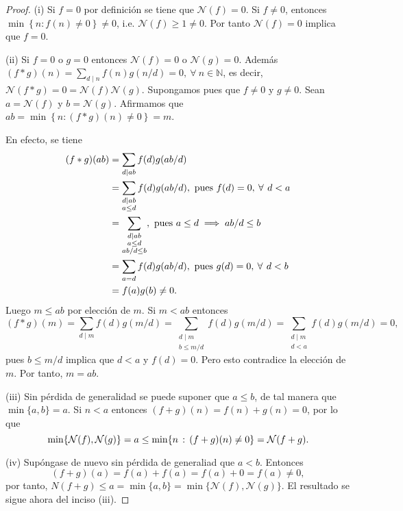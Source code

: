 \begin{proof}
(i) Si $f=0$ por definición se tiene que $\mathcal{N}(f)=0$. Si $f \neq 0$, entonces $\min \left\{n : f(n) \neq 0\right\}\neq 0$, i.e. $\mathcal{N}(f)\geq 1\neq 0$. Por tanto $\mathcal{N}(f)=0$ implica que $f=0$.
\bigskip

(ii) Si $f=0$ o $g=0$ entonces $\mathcal{N}(f)=0$ o $\mathcal{N}(g)=0$. Además $(f*g)(n)=\sum_{d \mid n} f(n)g(n/d)=0, \:\forall\: n \in\mathbb{N}$, es decir, $\mathcal{N}(f*g)=0=\mathcal{N}(f)\mathcal{N}(g)$. Supongamos pues que $f \neq 0$ y $g \neq 0$. Sean $a=\mathcal{N}(f)$ y $b=\mathcal{N}(g)$. Afirmamos que $a b=\min \left\{n : (f*g)(n) \ne 0\right\}=m$.
\bigskip

En efecto, se tiene
\begin{align*}
	(f*g)(a b) &= \sum_{d \mid a b} f(d)g(a b/d) \\
			   &= \sum_{\substack{d \mid a b \\ a \leq d}} f(d)g(a b/d), \textnormal{ pues }f(d)=0, \:\forall\: d<a \\
			   &= \sum_{\substack{d \mid a b \\ a \leq d \\ a b/d \leq b}}, \textnormal{ pues }a \leq d \implies a b/d \leq b \\
			   &= \sum_{a=d} f(d)g(a b/d), \textnormal{ pues }g(d)=0, \:\forall\: d<b \\
			   &= f(a)g(b)\neq 0.
\end{align*}
Luego $m \leq a b$ por elección de $m$. Si $m<a b$ entonces
\begin{equation*}
	(f * g)(m) = \sum_{d \mid m} f(d) g(m/d) = \sum_{\substack{d \mid m \\ b \le m/d}} f(d) g(m/d) = \sum_{\substack{d \mid m \\ d<a}} f(d) g(m/d) = 0,
\end{equation*}
pues $b \le m/d$ implica que $d<a$ y $f(d)=0$. Pero esto contradice la elección de $m$. Por tanto, $m=a b$.

\bigskip

(iii) Sin pérdida de generalidad se puede suponer que $a \le b$, de tal manera que $\min \{ a,b \} = a$. Si $n<a$ entonces $(f+g)(n) = f(n) + g(n) = 0$, por lo que
\begin{equation*}
    \min \{ \mathcal{N}(f),\mathcal{N}(g) \}=a \le \min \{ n \, : \, (f+g)(n) \ne 0 \}=\mathcal{N}(f+g).
\end{equation*}

(iv) Supóngase de nuevo sin pérdida de generaliad que $a<b$. Entonces
\begin{equation*}
	(f+g)(a) = f(a) + f(a) = f(a) + 0 = f(a) \ne 0,
\end{equation*}
por tanto, $N(f+g) \le a = \min \{ a,b \}=\min \{ \mathcal{N}(f),\mathcal{N}(g) \}$. El resultado se sigue ahora del inciso (iii).

\end{proof}
